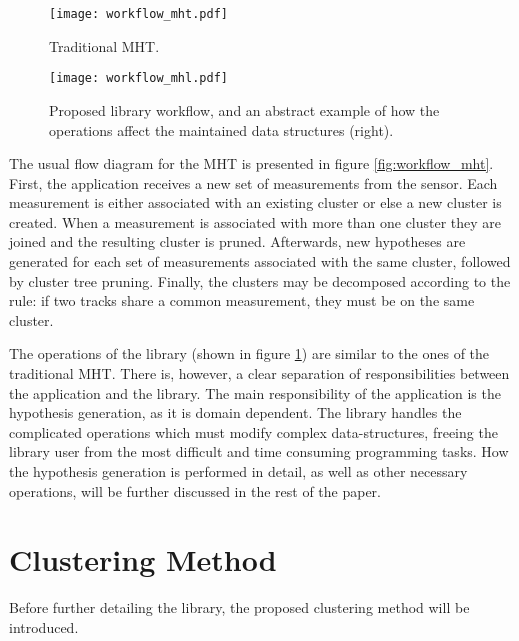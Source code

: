 \ifx \ommitimages  \undefined
\begin{figure}
\begin{minipage}[b]{0.30\textwidth}
\centering
\texttt{[image: workflow\_mht.pdf]}
\vspace{4.65mm}
\caption{Traditional MHT.}
\label{fig:workflow_mht}
\vspace{7.65mm}
\end{minipage}
\hspace{0\textwidth}
\begin{minipage}[b]{0.70\textwidth}
\centering
\texttt{[image: workflow\_mhl.pdf]}
\caption{Proposed library workflow, and an abstract example of how the operations affect the maintained data structures (right).}
\label{fig:workflow_mhl}
\end{minipage}
\end{figure}
\fi


The usual flow diagram for the MHT is presented in figure \ref{fig:workflow_mht}.
First, the application receives a new set of measurements from the sensor.
Each measurement is either associated with an existing cluster or else a new cluster is created.
When a measurement is associated with more than one cluster they are joined and the resulting cluster is pruned. 
Afterwards, new hypotheses are generated for each set of measurements associated with the same cluster, followed by cluster tree pruning. 
Finally, the clusters may be decomposed according to the rule: if two tracks share a common measurement, they must be on the same cluster.

The operations of the library (shown in figure \ref{fig:workflow_mhl}) are similar to the ones of the traditional MHT.
There is, however, a clear separation of responsibilities between the application and the library.
The main responsibility of the application is the hypothesis generation, as it is domain dependent. The library handles the complicated operations which must modify complex data-structures, freeing the library user from the most difficult and time consuming programming tasks.
How the hypothesis generation is performed in detail, as well as other necessary operations, will be further discussed in the rest of the paper.


\section{Clustering Method}
\label{sec:clustering_method}

Before further detailing the library, the proposed clustering method will be introduced. 

